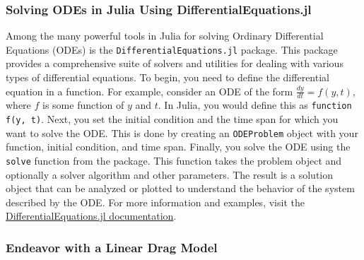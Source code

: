 \subsubsection{Solving ODEs in Julia Using DifferentialEquations.jl}

Among the many powerful tools in Julia for solving Ordinary Differential Equations (ODEs) is the \texttt{DifferentialEquations.jl} package. This package provides a comprehensive suite of solvers and utilities for dealing with various types of differential equations. To begin, you need to define the differential equation in a function. For example, consider an ODE of the form \(\frac{dy}{dt} = f(y, t)\), where \(f\) is some function of \(y\) and \(t\). In Julia, you would define this as \texttt{function f(y, t)}. Next, you set the initial condition and the time span for which you want to solve the ODE. This is done by creating an \texttt{ODEProblem} object with your function, initial condition, and time span. Finally, you solve the ODE using the \texttt{solve} function from the package. This function takes the problem object and optionally a solver algorithm and other parameters. The result is a solution object that can be analyzed or plotted to understand the behavior of the system described by the ODE. For more information and examples, visit the \href{https://diffeq.sciml.ai/stable/}{DifferentialEquations.jl documentation}.




\subsubsection{Endeavor with a Linear Drag Model}

